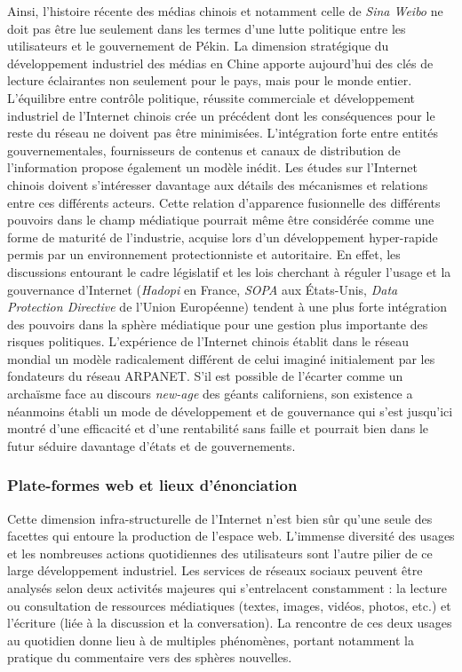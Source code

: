 Ainsi, l'histoire récente des médias chinois et notamment celle de \textit{Sina Weibo} ne doit pas être lue seulement dans les termes d'une lutte politique entre les utilisateurs et le gouvernement de Pékin. La dimension stratégique du développement industriel des médias en Chine apporte aujourd'hui des clés de lecture éclairantes non seulement pour le pays, mais pour le monde entier. L'équilibre entre contrôle politique, réussite commerciale et développement industriel de l'Internet chinois crée un précédent dont les conséquences pour le reste du réseau ne doivent pas être minimisées. L'intégration forte entre entités gouvernementales, fournisseurs de contenus et canaux de distribution de l'information propose également un modèle inédit. Les études sur l'Internet chinois doivent s'intéresser davantage aux détails des mécanismes et relations entre ces différents acteurs. Cette relation d'apparence fusionnelle des différents pouvoirs dans le champ médiatique pourrait même être considérée comme une forme de maturité de l'industrie, acquise lors d'un développement hyper-rapide permis par un environnement protectionniste et autoritaire. En effet, les  discussions entourant le cadre législatif et les lois cherchant à réguler l'usage et la gouvernance d'Internet (\textit{Hadopi} en France, \textit{SOPA} aux États-Unis, \textit{Data Protection Directive} de l'Union Européenne) tendent à une plus forte intégration des pouvoirs dans la sphère médiatique pour une gestion plus importante des risques politiques. L'expérience de l'Internet chinois établit dans le réseau mondial un modèle  radicalement différent de celui imaginé initialement par les fondateurs du réseau ARPANET. S'il est possible de l'écarter comme un archaïsme face au discours \textit{new-age} des géants californiens, son existence a néanmoins établi un mode de développement et de gouvernance qui s'est jusqu'ici montré d'une efficacité et d'une rentabilité sans faille et pourrait bien dans le futur séduire davantage d'états et de gouvernements.

\subsubsection{Plate-formes web et lieux d'énonciation}

Cette dimension infra-structurelle de l'Internet n'est bien sûr qu'une seule des facettes qui entoure la production de l'espace web. L'immense diversité des usages et les nombreuses actions quotidiennes des utilisateurs sont l'autre pilier de ce large développement industriel. Les services de réseaux sociaux peuvent être analysés selon deux activités majeures qui s'entrelacent constamment : la lecture ou consultation de ressources médiatiques (textes, images, vidéos, photos, etc.) et l'écriture (liée à la discussion et la conversation). La rencontre de ces deux usages au quotidien donne lieu à de multiples phénomènes, portant notamment la pratique du commentaire vers des sphères nouvelles.

